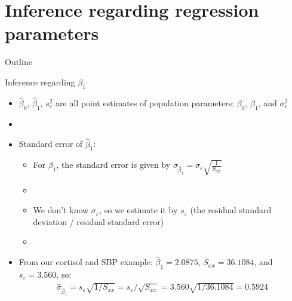 \documentclass[xcolor=dvipsnames]{beamer}
\begin{document}
\section{Inference regarding regression parameters}
\begin{frame}{Outline}
\tableofcontents[currentsection,subsectionstyle=show/shaded/hide]
\end{frame}

\begin{frame}{Inference regarding $\beta_1$}
	\begin{itemize}
		\item $\hat{\beta}_0$, $\hat{\beta}_1$, $s^2_{\varepsilon}$ are all point estimates of population parameters: $\beta_0$, $\beta_1$, and $\sigma^2_{\varepsilon}$
		\item[]
		\item Standard error of $\hat{\beta}_1$:
		\begin{itemize}
			\item For $\beta_1$, the standard error is given by $\sigma_{\hat{\beta}_1} = \sigma_{\varepsilon} \sqrt{\frac{1}{S_{xx}}}$
			\item[]
			\item We don't know $\sigma_{\varepsilon}$, so we estimate it by $s_{\varepsilon}$ (the residual standard deviation / residual standard error)
			\item[]
		\end{itemize}
	\item From our cortisol and SBP example: $\hat{\beta}_1 = 2.0875$, $S_{xx} = 36.1084$, and $s_{\varepsilon}=3.560$, so:
	\begin{gather*}
		\hat{\sigma}_{\hat{\beta}_1} = s_{\varepsilon} \sqrt{1/S_{xx}} = {s_{\varepsilon} / \sqrt{S_{xx}}}= 3.560 \sqrt{1/36.1084} = 0.5924
	\end{gather*}
	\end{itemize}
\end{frame}
\end{document}
